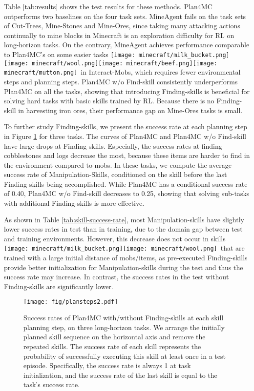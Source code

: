 \documentclass{article}
\newcommand{\mcbeef}{\texttt{[image: minecraft/beef.png]}}
\newcommand{\mcmilkbucket}{\texttt{[image: minecraft/milk\_bucket.png]}}
\newcommand{\mcmutton}{\texttt{[image: minecraft/mutton.png]}}
\newcommand{\mcwool}{\texttt{[image: minecraft/wool.png]}}
\begin{document}
Table \ref{tab:results} shows the test results for these methods. Plan4MC outperforms two baselines on the four task sets. MineAgent fails on the task sets of Cut-Trees, Mine-Stones and Mine-Ores, since taking many attacking actions continually to mine blocks in Minecraft is an exploration difficulty for RL on long-horizon tasks. On the contrary, MineAgent achieves performance comparable to Plan4MC's on some easier tasks \mcmilkbucket\mcwool\mcbeef\mcmutton \ in Interact-Mobs, which requires fewer environmental steps and planning steps. Plan4MC w/o Find-skill consistently underperforms Plan4MC on all the tasks, showing that introducing Finding-skills is beneficial for solving hard tasks with basic skills trained by RL. Because there is no Finding-skill in harvesting iron ores, their performance gap on Mine-Ores tasks is small.

To further study Finding-skills, we present the success rate at each planning step in Figure \ref{fig:ablation-find} for three tasks. The curves of Plan4MC and Plan4MC w/o Find-skill have large drops at Finding-skills. Especially, the success rates at finding cobblestones and logs decrease the most, because these items are harder to find in the environment compared to mobs. In these tasks, we compute the average success rate of Manipulation-Skills, conditioned on the skill before the last Finding-skills being accomplished. While Plan4MC has a conditional success rate of 0.40, Plan4MC w/o Find-skill decreases to 0.25, showing that solving sub-tasks with additional Finding-skills is more effective.

As shown in Table \ref{tab:skill-success-rate}, most Manipulation-skills have slightly lower success rates in test than in training, due to the domain gap between test and training environments. However, this decrease does not occur in skills \mcmilkbucket\mcwool \ that are trained with a large initial distance of mobs/items, as pre-executed Finding-skills provide better initialization for Manipulation-skills during the test and thus the success rate may increase. In contrast, the success rates in the test without Finding-skills are significantly lower.

\begin{figure}[!t]
  \centering
  \texttt{[image: fig/plansteps2.pdf]}
  \caption{Success rates of Plan4MC with/without Finding-skills at each skill planning step, on three long-horizon tasks. We arrange the initially planned skill sequence on the horizontal axis and remove the repeated skills. The success rate of each skill represents the probability of successfully executing this skill at least once in a test episode. Specifically, the success rate is always 1 at task initialization, and the success rate of the last skill is equal to the task's success rate.}
  \label{fig:ablation-find}
\end{figure}
\end{document}
